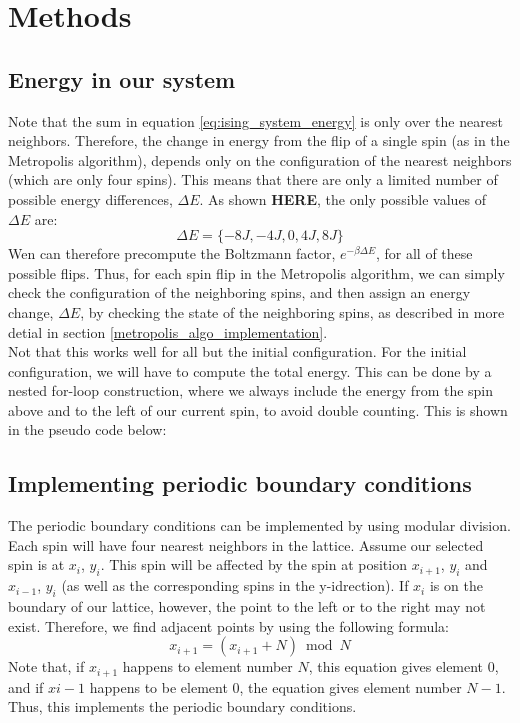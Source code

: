 \documentclass[a4paper, 10pt]{article}
\begin{document}
\section{Methods}
\subsection{Energy in our system}\label{energy_in_system}
Note that the sum in equation \ref{eq:ising_system_energy} is only over the nearest neighbors. Therefore, the change in energy from the flip of a single spin (as in the Metropolis algorithm), depends only on the configuration of the nearest neighbors (which are only four spins). This means that there are only a limited number of possible energy differences, $\Delta E$. As shown \textbf{HERE}, the only possible values of $\Delta E$ are:
$$\Delta E = \{ -8J, -4J, 0, 4J, 8J\}$$
Wen can therefore precompute the Boltzmann factor, $e^{-\beta \Delta E}$, for all of these possible flips. Thus, for each spin flip in the Metropolis algorithm, we can simply check the configuration of the neighboring spins, and then assign an energy change, $\Delta E$, by checking the state of the neighboring spins, as described in more detial in section \ref{metropolis_algo_implementation}.\\
\linebreak
Not that this works well for all but the initial configuration. For the initial configuration, we will have to compute the total energy. This can be done by a nested for-loop construction, where we always include the energy from the spin above and to the left of our current spin, to avoid double counting. This is shown in the pseudo code below:

\subsection{Implementing periodic boundary conditions}
The periodic boundary conditions can be implemented by using modular division. Each spin will have four nearest neighbors in the lattice. Assume our selected spin is at $x_i$, $y_i$. This spin will be affected by the spin at position $x_{i+1}$, $y_i$ and $x_{i-1}$, $y_i$ (as well as the corresponding spins in the y-idrection). If $x_i$ is on the boundary of our lattice, however, the point to the left or to the right may not exist. Therefore, we find adjacent points by using the following formula:
\begin{equation}\label{eq:modular_arithmetic}
x_{i+1}=(x_{i+1}+N) \bmod N
\end{equation}
Note that, if $x_{i+1}$ happens to element number $N$, this equation gives element 0, and if $x{i-1}$ happens to be element 0, the equation gives element number $N-1$. Thus, this implements the periodic boundary conditions.
\end{document}
